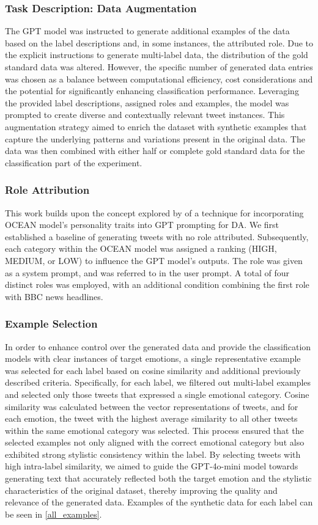 \documentclass[manuscript]{clv3}
\begin{document}
\subsubsection{Task Description: Data Augmentation} The GPT model was instructed to generate additional examples of the data based on the label descriptions and, in some instances, the attributed role. Due to the explicit instructions to generate multi-label data, the distribution of the gold standard data was altered. However, the specific number of generated data entries was chosen as a balance between computational efficiency, cost considerations and the potential for significantly enhancing classification performance. Leveraging the provided label descriptions, assigned roles and examples, the model was prompted to create diverse and contextually relevant tweet instances. This augmentation strategy aimed to enrich the dataset with synthetic examples that capture the underlying patterns and variations present in the original data. The data was then combined with either half or complete gold standard data for the classification part of the experiment.
\subsubsection{Role Attribution} This work builds upon the concept explored by \citet{hilliard2024elicitingpersonalitytraitslarge} of a technique for incorporating OCEAN model's personality traits into GPT prompting for DA. We first established a baseline of generating tweets with no role attributed. Subsequently, each category within the OCEAN model was assigned a ranking (HIGH, MEDIUM, or LOW) to influence the GPT model's outputs. The role was given as a system prompt, and was referred to in the user prompt. A total of four distinct roles was employed, with an additional condition combining the first role with BBC news headlines. 
\subsubsection{Example Selection} In order to enhance control over the generated data and provide the classification models with clear instances of target emotions, a single representative example was selected for each label based on cosine similarity and additional previously described criteria. Specifically, for each label, we filtered out multi-label examples and selected only those tweets that expressed a single emotional category. Cosine similarity was calculated between the vector representations of tweets, and for each emotion, the tweet with the highest average similarity to all other tweets within the same emotional category was selected. This process ensured that the selected examples not only aligned with the correct emotional category but also exhibited strong stylistic consistency within the label. By selecting tweets with high intra-label similarity, we aimed to guide the GPT-4o-mini model towards generating text that accurately reflected both the target emotion and the stylistic characteristics of the original dataset, thereby improving the quality and relevance of the generated data. Examples of the synthetic data for each label can be seen in \autoref{all_examples}.
\end{document}

